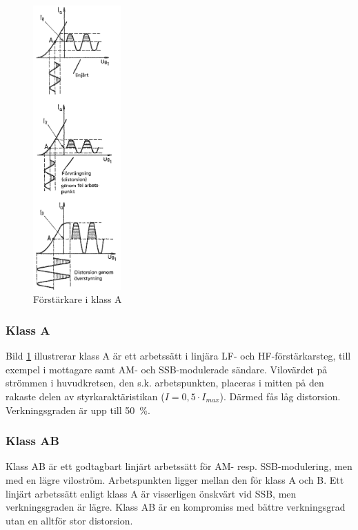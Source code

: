 \begin{figure}
\includegraphics[width=0.3\textwidth]{images/cropped_pdfs/bild_2_3-44.pdf}
\caption{Förstärkare i klass A}
\label{fig:BildII3-44}
\end{figure}

\subsubsection{Klass A}

Bild \ref{fig:BildII3-44} illustrerar klass A är ett arbetssätt i linjära
LF- och HF-förstärkarsteg, till exempel i mottagare samt AM- och SSB-modulerade
sändare.
Vilovärdet på strömmen i huvudkretsen, den s.k. arbetspunkten, placeras i
mitten på den rakaste delen av styrkaraktäristikan (\(I=0,5\cdot I_{max}\)).
Därmed fås låg distorsion.
Verkningsgraden är upp till 50~\%.

\subsubsection{Klass AB}

Klass AB är ett godtagbart linjärt arbetssätt för AM- resp. SSB-modulering,
men med en lägre viloström.
Arbetspunkten ligger mellan den för klass A och B.
Ett linjärt arbetssätt enligt klass A är visserligen önskvärt vid SSB, men
verkningsgraden är lägre.
Klass AB är en kompromiss med bättre verkningsgrad utan en alltför stor
distorsion.

